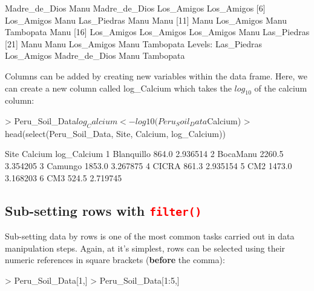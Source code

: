 \documentclass[a4paper,12pt]{article}
\newcommand\code[1]{\textcolor{red}{\texttt{#1}}}
\begin{document}
\begin{shaded}
\begin{Schunk}
\begin{Soutput}
 [1] Madre_de_Dios Manu          Madre_de_Dios Los_Amigos    Los_Amigos   
 [6] Los_Amigos    Manu          Las_Piedras   Manu          Manu         
[11] Manu          Los_Amigos    Manu          Tambopata     Manu         
[16] Los_Amigos    Los_Amigos    Los_Amigos    Manu          Las_Piedras  
[21] Manu          Manu          Los_Amigos    Manu          Tambopata    
Levels: Las_Piedras Los_Amigos Madre_de_Dios Manu Tambopata
\end{Soutput}
\end{Schunk}
\end{shaded}

Columns can be added by creating new variables within the data frame. Here, we can create a new column called log\_Calcium which takes the $log_{10}$ of the calcium column:

\begin{shaded}
\begin{Schunk}
\begin{Sinput}
> Peru_Soil_Data$log_Calcium <- log10(Peru_Soil_Data$Calcium)
> head(select(Peru_Soil_Data, Site, Calcium, log_Calcium))
\end{Sinput}
\begin{Soutput}
        Site Calcium log_Calcium
1 Blanquillo   864.0    2.936514
2   BocaManu  2260.5    3.354205
3    Camungo  1853.0    3.267875
4      CICRA   861.3    2.935154
5        CM2  1473.0    3.168203
6        CM3   524.5    2.719745
\end{Soutput}
\end{Schunk}
\end{shaded}

\subsection{Sub-setting rows with \code{filter()}}

Sub-setting data by rows is one of the most common tasks carried out in data manipulation steps. Again, at it's simplest, rows can be selected using their numeric references in square brackets (\textbf{before} the comma):

\begin{shaded}
\begin{Schunk}
\begin{Sinput}
> Peru_Soil_Data[1,]
> Peru_Soil_Data[1:5,]
\end{Sinput}
\end{Schunk}
\end{shaded}
\end{document}
